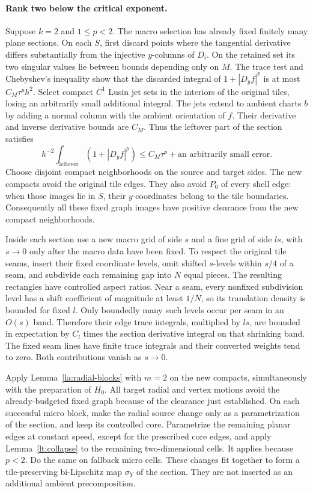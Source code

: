\paragraph{Rank two below the critical exponent.}
Suppose $k=2$ and $1\le p<2$.  The macro selection has already fixed
finitely many plane sections.  On each $S$, first discard points
where the tangential derivative differs substantially from the
injective $y$-columns of $D_i$.  On the retained set its two singular
values lie between bounds depending only on $M$.  The trace test and
Chebyshev's inequality show that the discarded integral of
$1+|D_yf|^p$ is at most $C_M\tau^p h^2$.  Select compact $C^1$ Lusin
jet sets in the interiors of the original tiles, losing an
arbitrarily small additional integral.  The jets extend to ambient
charts $b$ by adding a normal column with the ambient orientation of
$f$.  Their derivative and inverse derivative bounds are $C_M$.
Thus the leftover part of the section satisfies
\begin{equation}\label{la:section-leftover}
 h^{-2}\int_{\text{leftover}}(1+|D_yf|^p)
       \le C_M\tau^p+\text{an arbitrarily small error}.
\end{equation}
Choose disjoint compact neighborhoods on the source and target sides.
The new compacts avoid the original tile edges.  They also avoid
$P_0$ of every shell edge: when those images lie in $S$, their
$y$-coordinates belong to the tile boundaries.  Consequently all
these fixed graph images have positive clearance from the new
compact neighborhoods.

Inside each section use a new macro grid of side $s$ and a fine grid
of side $ls$, with $s\to0$ only after the macro data have been fixed.
To respect the original tile seams, insert their fixed coordinate
levels, omit shifted $s$-levels within $s/4$ of a seam, and subdivide
each remaining gap into $N$ equal pieces.  The resulting rectangles
have controlled aspect ratios.  Near a seam, every nonfixed
subdivision level has a shift coefficient of magnitude at least
$1/N$, so its translation density is bounded for fixed $l$.
Only boundedly many such levels occur per seam in an $O(s)$ band.
Therefore their edge trace integrals, multiplied by $ls$, are bounded
in expectation by $C_l$ times the section derivative integral on
that shrinking band.  The fixed seam lines have finite trace
integrals and their converted weights tend to zero.  Both
contributions vanish as $s\to0$.

Apply Lemma~\ref{la:radial-blocks} with $m=2$ on the new compacts,
simultaneously with the preparation of $H_0$.  All target radial and
vertex motions avoid the already-budgeted fixed graph because of the
clearance just established.  On each successful micro block, make
the radial source change only as a parametrization of the section,
and keep its controlled core.  Parametrize the remaining planar
edges at constant speed, except for the prescribed core edges, and
apply Lemma~\ref{lt:collapse} to the remaining two-dimensional cells.
It applies because $p<2$.  Do the same on fallback micro cells.
These changes fit together to form a tile-preserving bi-Lipschitz
map $\sigma_Y$ of the section.  They are not inserted as an
additional ambient precomposition.

